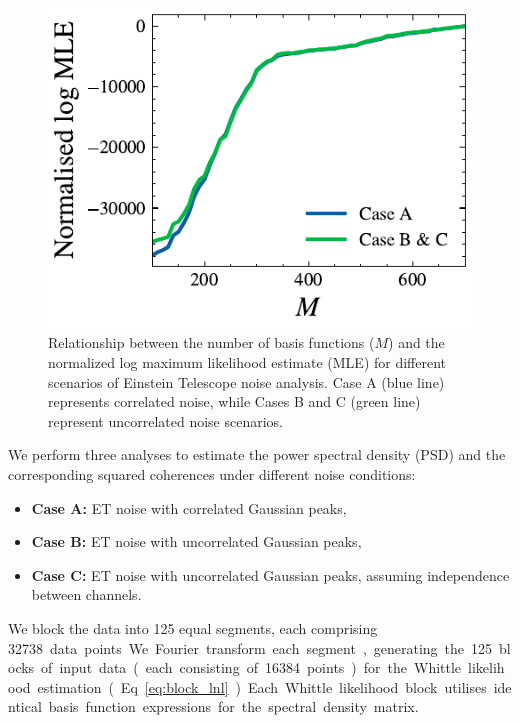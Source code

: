 \documentclass[%
 reprint,
 amsmath,amssymb,
 aps,
 nofootinbib,
]{revtex4-2}
\begin{document}
\begin{figure}[!t]
\centering
  \includegraphics[width=\columnwidth]{et_basis_fns.pdf}
  \caption{Relationship between the number of basis functions ($M$) and the normalized log maximum likelihood estimate (MLE) for different scenarios of Einstein Telescope noise analysis. Case A (blue line) represents correlated noise, while Cases B and C (green line) represent uncorrelated noise scenarios.
  }
  \label{et_corr_basis_funs_vs_mle}
\end{figure}


We perform three analyses to estimate the power spectral density (PSD) and the corresponding squared coherences under different noise conditions: 
\begin{itemize}
    \item[] \textbf{Case A:}  ET noise with correlated Gaussian peaks,
    \item[] \textbf{Case B:} ET noise with uncorrelated Gaussian peaks,
    \item[] \textbf{Case C:} ET noise with uncorrelated Gaussian peaks, assuming independence between channels.
\end{itemize}


We block the data into 125 equal segments, each comprising \SI{32738} data points.
We Fourier transform each segment, generating the 125 blocks of input data (each consisting of \num{16 384} points) for the Whittle likelihood estimation (Eq.~\ref{eq:block_lnl}). 
Each Whittle likelihood block utilises identical basis function expressions for the spectral density matrix. 
\end{document}

